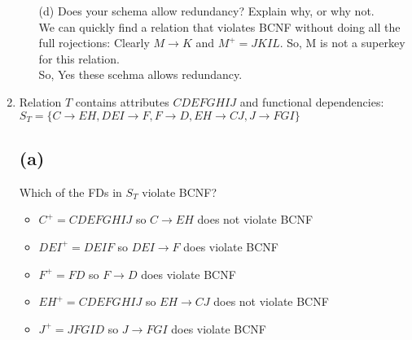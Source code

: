 \documentclass[12pt]{article}
\begin{document}
\begin{enumerate}
\begin{itemize}
    \item[(d)] Does your schema allow redundancy? Explain why, or why not. \\[5pt]
    We can quickly find a relation that violates BCNF without doing all the full rojections:  Clearly $M \rightarrow K$ and
    $M^+ = JKIL$. So, M is not a superkey for this relation.\\
    So, Yes these scehma allows redundancy.\\
    
    

  
  \end{itemize}
  \newpage
  \item Relation $T$ contains attributes $CDEFGHIJ$ and functional dependencies:\newline
$S_T = \{ C \rightarrow EH, DEI \rightarrow F, F \rightarrow D, EH \rightarrow CJ, J \rightarrow FGI\}$
\subsection*{(a)}
Which of the FDs in $S_T$ violate BCNF?

\begin{itemize}
    \item $C^+ = CDEFGHIJ$   \; so $C \rightarrow EH$ does not violate BCNF
    \item $DEI^+ = DEIF$     \; so $DEI \rightarrow F$ does violate BCNF
    \item $F^+ = FD$         \; so $F \rightarrow D$ does violate BCNF
    \item $EH^+ = CDEFGHIJ$  \; so $EH \rightarrow CJ$ does not violate BCNF
    \item $J^+ = JFGID$    \; so $J \rightarrow FGI$ does violate BCNF 
\end{itemize}

\end{enumerate}
\end{document}
